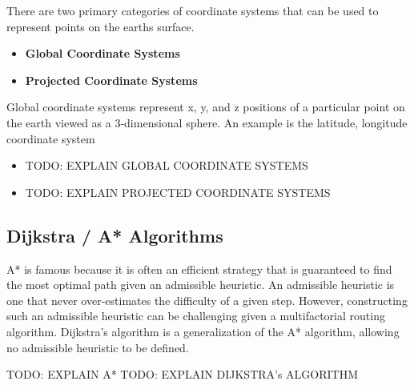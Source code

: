 \documentclass[
]{article}
\providecommand{\tightlist}{%
  \setlength{\itemsep}{0pt}\setlength{\parskip}{0pt}}
\begin{document}
There are two primary categories of coordinate systems that can be used
to represent points on the earths surface.

\begin{itemize}
\tightlist
\item
  \textbf{Global Coordinate Systems}
\item
  \textbf{Projected Coordinate Systems}
\end{itemize}

Global coordinate systems represent x, y, and z positions of a
particular point on the earth viewed as a 3-dimensional sphere. An
example is the latitude, longitude coordinate system

\begin{itemize}
\tightlist
\item
  TODO: EXPLAIN GLOBAL COORDINATE SYSTEMS
\item
  TODO: EXPLAIN PROJECTED COORDINATE SYSTEMS
\end{itemize}

\hypertarget{dijkstra-a-algorithms}{%
\subsection{Dijkstra / A* Algorithms}\label{dijkstra-a-algorithms}}

A* is famous because it is often an efficient strategy that is
guaranteed to find the most optimal path given an admissible heuristic.
An admissible heuristic is one that never over-estimates the difficulty
of a given step. However, constructing such an admissible heuristic can
be challenging given a multifactorial routing algorithm. Dijkstra's
algorithm is a generalization of the A* algorithm, allowing no
admissible heuristic to be defined.

TODO: EXPLAIN A* TODO: EXPLAIN DIJKSTRA's ALGORITHM
\end{document}
